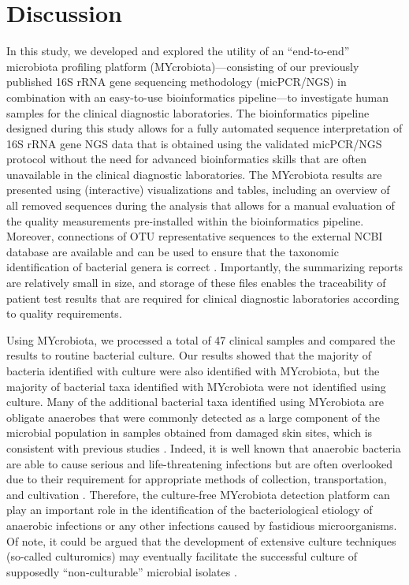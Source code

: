 \section*{Discussion}

In this study, we developed and explored the utility of an “end-to-end” microbiota profiling platform (MYcrobiota)—consisting of our
previously published 16S rRNA gene sequencing methodology (micPCR/NGS) in combination with an easy-to-use bioinformatics pipeline—to
investigate human samples for the clinical diagnostic laboratories. The bioinformatics pipeline designed during this study allows for
a fully automated sequence interpretation of 16S rRNA gene NGS data that is obtained using the validated micPCR/NGS protocol without
the need for advanced bioinformatics skills that are often unavailable in the clinical diagnostic laboratories. The MYcrobiota results
are presented using (interactive) visualizations and tables, including an overview of all removed sequences during the analysis that
allows for a manual evaluation of the quality measurements pre-installed within the bioinformatics pipeline. Moreover, connections of
OTU representative sequences to the external NCBI database are available and can be used to ensure that the taxonomic identification
of bacterial genera is correct \cite{boers2016suddenly}. Importantly, the summarizing reports are relatively small in size, and storage of these files
enables the traceability of patient test results that are required for clinical diagnostic laboratories according to quality requirements.

Using MYcrobiota, we processed a total of 47 clinical samples and compared the results to routine bacterial culture. Our results showed
that the majority of bacteria identified with culture were also identified with MYcrobiota, but the majority of bacterial taxa identified
with MYcrobiota were not identified using culture. Many of the additional bacterial taxa identified using MYcrobiota are obligate anaerobes
that were commonly detected as a large component of the microbial population in samples obtained from damaged skin sites, which is consistent
with previous studies \cite{price2009community,smith2016one}. Indeed, it is well known that anaerobic bacteria are able to cause serious and life-threatening infections
but are often overlooked due to their requirement for appropriate methods of collection, transportation, and cultivation \cite{brook2002clinical}. Therefore,
the culture-free MYcrobiota detection platform can play an important role in the identification of the bacteriological etiology of anaerobic
infections or any other infections caused by fastidious microorganisms. Of note, it could be argued that the development of extensive culture
techniques (so-called culturomics) may eventually facilitate the successful culture of supposedly “non-culturable” microbial isolates \cite{lagier2015rebirth}.

